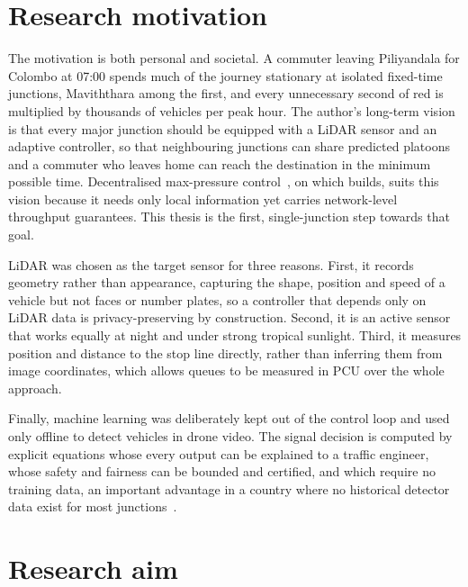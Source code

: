 \section{Research motivation}\label{sec:intro-motivation}

The motivation is both personal and societal. A commuter leaving Piliyandala for Colombo at 07:00 spends much of the journey stationary at isolated fixed-time junctions, Maviththara among the first, and every unnecessary second of red is multiplied by thousands of vehicles per peak hour. The author's long-term vision is that every major junction should be equipped with a LiDAR sensor and an adaptive controller, so that neighbouring junctions can share predicted platoons and a commuter who leaves home can reach the destination in the minimum possible time. Decentralised max-pressure control~\cite{varaiya2013maxpressure}, on which \prism{} builds, suits this vision because it needs only local information yet carries network-level throughput guarantees. This thesis is the first, single-junction step towards that goal.

LiDAR was chosen as the target sensor for three reasons. First, it records geometry rather than appearance, capturing the shape, position and speed of a vehicle but not faces or number plates, so a controller that depends only on LiDAR data is privacy-preserving by construction. Second, it is an active sensor that works equally at night and under strong tropical sunlight. Third, it measures position and distance to the stop line directly, rather than inferring them from image coordinates, which allows queues to be measured in PCU over the whole approach.

Finally, machine learning was deliberately kept out of the control loop and used only offline to detect vehicles in drone video. The signal decision is computed by explicit equations whose every output can be explained to a traffic engineer, whose safety and fairness can be bounded and certified, and which require no training data, an important advantage in a country where no historical detector data exist for most junctions~\cite{noaeen2022rl}.

\section{Research aim}\label{sec:intro-aim}


